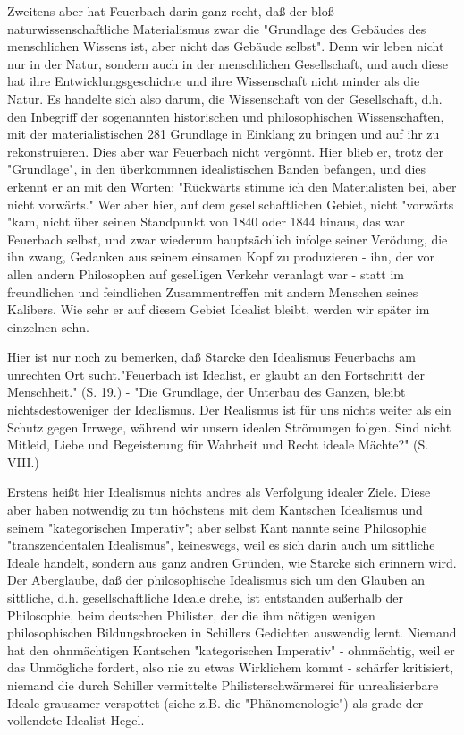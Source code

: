 Zweitens aber hat Feuerbach darin ganz recht, daß der bloß
naturwissenschaftliche Materialismus zwar die "Grundlage des Gebäudes
des menschlichen Wissens ist, aber nicht das Gebäude selbst". Denn wir
leben nicht nur in der Natur, sondern auch in der menschlichen
Gesellschaft, und auch diese hat ihre Entwicklungsgeschichte und ihre
Wissenschaft nicht minder als die Natur. Es handelte sich also darum,
die Wissenschaft von der Gesellschaft, d.h. den Inbegriff der
sogenannten historischen und philosophischen Wissenschaften, mit der
materialistischen \textbar{}281\textbar{} Grundlage
in Einklang zu bringen und auf ihr zu rekonstruieren. Dies aber war
Feuerbach nicht vergönnt. Hier blieb er, trotz der "Grundlage", in den
überkommnen idealistischen Banden befangen, und dies erkennt er an mit
den Worten: "Rückwärts stimme ich den Materialisten bei, aber nicht
vorwärts." Wer aber hier, auf dem gesellschaftlichen Gebiet, nicht
"vorwärts "kam, nicht über seinen Standpunkt von 1840 oder 1844 hinaus,
das war Feuerbach selbst, und zwar wiederum hauptsächlich infolge seiner
Verödung, die ihn zwang, Gedanken aus seinem einsamen Kopf zu
produzieren - ihn, der vor allen andern Philosophen auf geselligen
Verkehr veranlagt war - statt im freundlichen und feindlichen
Zusammentreffen mit andern Menschen seines Kalibers. Wie sehr er auf
diesem Gebiet Idealist bleibt, werden wir später im einzelnen sehn.

Hier ist nur noch zu bemerken, daß Starcke den Idealismus
Feuerbachs am unrechten Ort sucht."Feuerbach ist Idealist, er glaubt an
den Fortschritt der Menschheit." (S. 19.) - "Die Grundlage, der Unterbau
des Ganzen, bleibt nichtsdestoweniger der Idealismus. Der Realismus ist
für uns nichts weiter als ein Schutz gegen Irrwege, während wir unsern
idealen Strömungen folgen. Sind nicht Mitleid, Liebe und Begeisterung
für Wahrheit und Recht ideale Mächte?" (S. VIII.)

Erstens heißt hier Idealismus nichts andres als Verfolgung
idealer Ziele. Diese aber haben notwendig zu tun höchstens mit dem
Kantschen Idealismus und seinem "kategorischen Imperativ"; aber selbst
Kant nannte seine Philosophie "transzendentalen Idealismus", keineswegs,
weil es sich darin auch um sittliche Ideale handelt, sondern aus ganz
andren Gründen, wie Starcke sich erinnern wird. Der Aberglaube, daß der
philosophische Idealismus sich um den Glauben an sittliche, d.h.
gesellschaftliche Ideale drehe, ist entstanden außerhalb der
Philosophie, beim deutschen Philister, der die ihm nötigen wenigen
philosophischen Bildungsbrocken in Schillers Gedichten auswendig lernt.
Niemand hat den ohnmächtigen Kantschen "kategorischen Imperativ" -
ohnmächtig, weil er das Unmögliche fordert, also nie zu etwas Wirklichem
kommt - schärfer kritisiert, niemand die durch Schiller vermittelte
Philisterschwärmerei für unrealisierbare Ideale grausamer verspottet
(siehe z.B. die "Phänomenologie") als grade der vollendete Idealist
Hegel.

